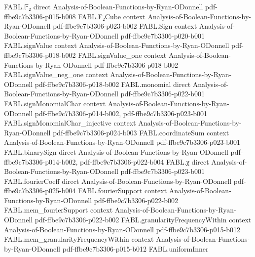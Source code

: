 \begin{theorem}
\leanok
{}
\proofstep
  {FABL.𝔽₂}
  {direct}
  {Analysis-of-Boolean-Functions-by-Ryan-ODonnell}
  {pdf-ffbe9c7b3306-p015-b008}
\proofstep
  {FABL.F₂Cube}
  {context}
  {Analysis-of-Boolean-Functions-by-Ryan-ODonnell}
  {pdf-ffbe9c7b3306-p023-b002}
\proofstep
  {FABL.Sign}
  {context}
  {Analysis-of-Boolean-Functions-by-Ryan-ODonnell}
  {pdf-ffbe9c7b3306-p020-b001}
\proofstep
  {FABL.signValue}
  {context}
  {Analysis-of-Boolean-Functions-by-Ryan-ODonnell}
  {pdf-ffbe9c7b3306-p018-b002}
\proofstep
  {FABL.signValue_one}
  {context}
  {Analysis-of-Boolean-Functions-by-Ryan-ODonnell}
  {pdf-ffbe9c7b3306-p018-b002}
\proofstep
  {FABL.signValue_neg_one}
  {context}
  {Analysis-of-Boolean-Functions-by-Ryan-ODonnell}
  {pdf-ffbe9c7b3306-p018-b002}
\proofstep
  {FABL.monomial}
  {direct}
  {Analysis-of-Boolean-Functions-by-Ryan-ODonnell}
  {pdf-ffbe9c7b3306-p022-b001}
\proofstep
  {FABL.signMonomialChar}
  {context}
  {Analysis-of-Boolean-Functions-by-Ryan-ODonnell}
  {pdf-ffbe9c7b3306-p014-b002,
    pdf-ffbe9c7b3306-p023-b001}
\proofstep
  {FABL.signMonomialChar_injective}
  {context}
  {Analysis-of-Boolean-Functions-by-Ryan-ODonnell}
  {pdf-ffbe9c7b3306-p024-b003}
\proofstep
  {FABL.coordinateSum}
  {context}
  {Analysis-of-Boolean-Functions-by-Ryan-ODonnell}
  {pdf-ffbe9c7b3306-p023-b001}
\proofstep
  {FABL.binarySign}
  {direct}
  {Analysis-of-Boolean-Functions-by-Ryan-ODonnell}
  {pdf-ffbe9c7b3306-p014-b002,
    pdf-ffbe9c7b3306-p022-b004}
\proofstep
  {FABL.χ}
  {direct}
  {Analysis-of-Boolean-Functions-by-Ryan-ODonnell}
  {pdf-ffbe9c7b3306-p023-b001}
\proofstep
  {FABL.fourierCoeff}
  {direct}
  {Analysis-of-Boolean-Functions-by-Ryan-ODonnell}
  {pdf-ffbe9c7b3306-p025-b004}
\proofstep
  {FABL.fourierSupport}
  {context}
  {Analysis-of-Boolean-Functions-by-Ryan-ODonnell}
  {pdf-ffbe9c7b3306-p022-b002}
\proofstep
  {FABL.mem_fourierSupport}
  {context}
  {Analysis-of-Boolean-Functions-by-Ryan-ODonnell}
  {pdf-ffbe9c7b3306-p022-b002}
\proofstep
  {FABL.granularityFrequencyWithin}
  {context}
  {Analysis-of-Boolean-Functions-by-Ryan-ODonnell}
  {pdf-ffbe9c7b3306-p015-b012}
\proofstep
  {FABL.mem_granularityFrequencyWithin}
  {context}
  {Analysis-of-Boolean-Functions-by-Ryan-ODonnell}
  {pdf-ffbe9c7b3306-p015-b012}
\proofstep
  {FABL.uniformInner}

\end{theorem}
